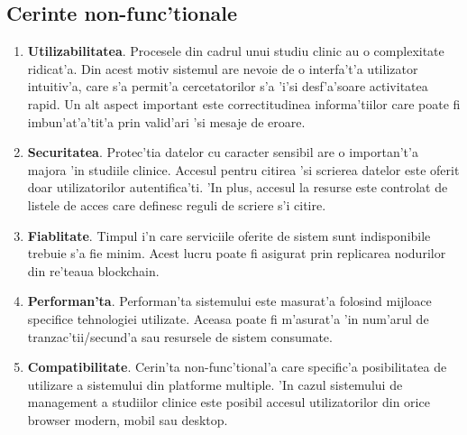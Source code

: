 \documentclass[12pt,a4paper,twoside]{report}
\begin{document}
\subsection{Cerinte non-func'tionale}
\begin{enumerate}
\item \textbf{Utilizabilitatea}. Procesele din cadrul unui studiu clinic au o complexitate ridicat'a. Din acest motiv sistemul are nevoie de o interfa't'a utilizator intuitiv'a, care s'a permit'a cercetatorilor s'a 'i'si desf'a'soare activitatea rapid. Un alt aspect important este correctitudinea informa'tiilor care poate fi imbun'at'a'tit'a prin valid'ari 'si mesaje de eroare.
\item \textbf{Securitatea}. Protec'tia datelor cu caracter sensibil are o importan't'a majora 'in studiile clinice. Accesul pentru citirea 'si scrierea datelor este oferit doar utilizatorilor autentifica'ti. 'In plus, accesul la resurse este controlat de listele de acces care definesc reguli de scriere s'i citire.
\item \textbf{Fiablitate}. Timpul i'n care serviciile oferite de sistem sunt indisponibile trebuie s'a fie minim. Acest lucru poate fi asigurat prin replicarea nodurilor din re'teaua blockchain.
\item \textbf{Performan'ta}. Performan'ta sistemului este masurat'a folosind mijloace specifice tehnologiei utilizate. Aceasa poate fi m'asurat'a 'in num'arul de tranzac'tii/secund'a sau resursele de sistem consumate.
\item \textbf{Compatibilitate}. Cerin'ta non-func'tional'a care specific'a posibilitatea de utilizare a sistemului din platforme multiple. 'In cazul sistemului de management a studiilor clinice este posibil accesul utilizatorilor din orice browser modern, mobil sau desktop. 
\end{enumerate}
\end{document}
